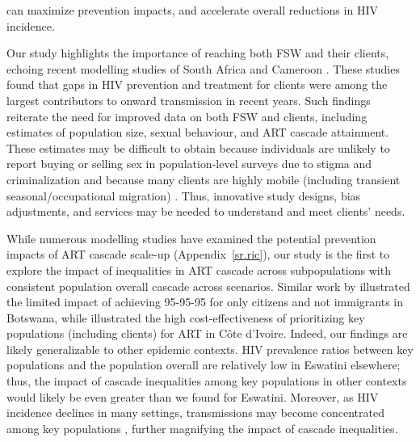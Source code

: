 can maximize prevention impacts, and accelerate overall reductions in HIV incidence.
\par
Our study highlights the importance of reaching both FSW and their clients,
echoing recent modelling studies of South Africa and Cameroon \cite{Stone2021,Silhol2024}.
These studies found that gaps in HIV prevention and treatment for clients
were among the largest contributors to onward transmission in recent years.
Such findings reiterate the need for improved data on both FSW and clients,
including estimates of population size, sexual behaviour, and ART cascade attainment.
These estimates may be difficult to obtain
because individuals are unlikely to report buying or selling sex in population-level surveys
due to stigma and criminalization \cite{Behanzin2013} and
because many clients are highly mobile
(including transient seasonal/occupational migration) \cite{Camlin2019}.
Thus, innovative study designs, bias adjustments, and services may be needed
to understand and meet clients' needs.
\par
While numerous modelling studies have examined
the potential prevention impacts of ART cascade scale-up
\cite{Knight2022sr} (Appendix~\ref{sr.ric}),
our study is the first to explore the impact of
inequalities in ART cascade across subpopulations
with consistent population overall cascade across scenarios.
Similar work by \citet{Marukutira2020} illustrated the limited impact of
achieving 95-95-95 for only citizens and not immigrants in Botswana,
while \citet{Maheu-Giroux2019cost} illustrated the high cost-effectiveness of
prioritizing key populations (including clients) for ART in C\^{o}te d’Ivoire.
Indeed, our findings are likely generalizable to other epidemic contexts.
HIV prevalence ratios between key populations and the population overall
are relatively low in Eswatini \vs elsewhere;
thus, the impact of cascade inequalities among key populations in other contexts
would likely be even greater than we found for Eswatini.
Moreover, as HIV incidence declines in many settings,
transmissions may become concentrated among key populations \cite{Brown2019},
further magnifying the impact of cascade inequalities.
